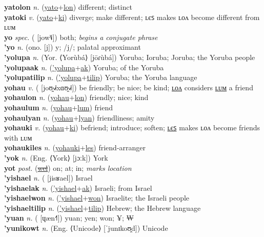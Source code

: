 \textbf{yatolon} \textit{n.} (\hyperref[yato]{yato}+\hyperref[lon]{lon})
different; distinct \label{yatolon} \\
\textbf{yatoki} \textit{v.} (\hyperref[yato]{yato}+\hyperref[ki]{ki})
diverge; make different; ʟєꜱ makes ʟᴏᴧ become different from ʟᴜᴍ \label{yatoki} \\
\textbf{yo} \textit{spec.} ( [jow˥˩])
both; \textit{begins a conjugate phrase} \label{yo} \\
\textbf{'yo} \textit{n.} (ono. [j])
y; /j/; palatal approximant \label{'yo} \\
\textbf{'yolupa} \textit{n.} (Yor. ⟨Yorùbá⟩ [jōɾùbá])
Yoruba; Ioruba; Joruba; the Yoruba people \label{'yolupa} \\
\textbf{'yolupaak} \textit{n.} (\hyperref['yolupa]{'yolupa}+\hyperref[ak]{ak})
Yoruba; of the Yoruba \label{'yolupaak} \\
\textbf{'yolupatilip} \textit{n.} (\hyperref['yolupa]{'yolupa}+\hyperref[tilip]{tilip})
Yoruba; the Yoruba language \label{'yolupatilip} \\
\textbf{yohau} \textit{v.} ( [joʊ̯˧˩˧xɑʊ̯˧˩˧])
be friendly; be nice; be kind; \hyperref[yohaulon]{ʟᴏᴧ} considers \hyperref[yohaulum]{ʟᴜᴍ} a friend \label{yohau} \\
\textbf{yohaulon} \textit{n.} (\hyperref[yohau]{yohau}+\hyperref[lon]{lon})
friendly; nice; kind \label{yohaulon} \\
\textbf{yohaulum} \textit{n.} (\hyperref[yohau]{yohau}+\hyperref[lum]{lum})
friend \label{yohaulum} \\
\textbf{yohaulyan} \textit{n.} (\hyperref[yohau]{yohau}+\hyperref[lyan]{lyan})
friendliness; amity \label{yohaulyan} \\
\textbf{yohauki} \textit{v.} (\hyperref[yohau]{yohau}+\hyperref[ki]{ki})
befriend; introduce; soften; \hyperref[yohaukiles]{ʟєꜱ} makes ʟᴏᴧ become friends with ʟᴜᴍ \label{yohauki} \\
\textbf{yohaukiles} \textit{n.} (\hyperref[yohauki]{yohauki}+\hyperref[les]{les})
friend-arranger \label{yohaukiles} \\
\textbf{'yok} \textit{n.} (Eng. ⟨York⟩ [jɔːk])
York \label{'yok} \\
\textbf{yot} \textit{post.} (\hyperref[wel]{\sout{wel}})
on; at; in; \textit{marks location} \label{yot} \\
\textbf{'yishael} \textit{n.} ( [jisʁael])
Israel \label{'yishael} \\
\textbf{'yishaelak} \textit{n.} (\hyperref['yishael]{'yishael}+\hyperref[ak]{ak})
Israeli; from Israel \label{'yishaelak} \\
\textbf{'yishaelwon} \textit{n.} (\hyperref['yishael]{'yishael}+\hyperref[won]{won})
Israelite; the Israeli people \label{'yishaelwon} \\
\textbf{'yishaeltilip} \textit{n.} (\hyperref['yishael]{'yishael}+\hyperref[tilip]{tilip})
Hebrew; the Hebrew language \label{'yishaeltilip} \\
\textbf{'yuan} \textit{n.} ( [ɥæn˧˥])
yuan; yen; won; ¥; ₩ \label{'yuan} \\
\textbf{'yunikowt} \textit{n.} (Eng. ⟨Unicode⟩ [ˈjunɪkoʊ̯d])
Unicode \label{'yunikowt} 

